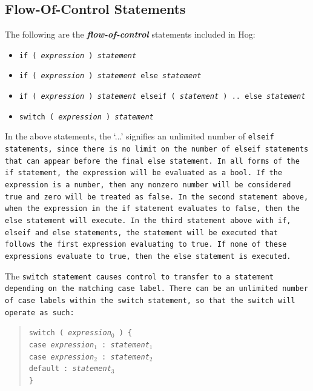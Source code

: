 \documentclass{article}
\begin{document}

\subsection{Flow-Of-Control Statements} %
\label{sub:flow_of_control_statements}

The following are the \textbf{\emph{flow-of-control}} statements included in Hog:

\begin{itemize}
  \item[] \tt if ( \rm \emph{expression} \tt ) \rm \emph{statement}
  \item[] \tt if ( \rm \emph{expression} \tt ) \rm \emph{statement} \tt else \rm \emph{statement}
  \item[] \tt if ( \rm \emph{expression} \tt ) \rm \emph{statement} \tt elseif ( \rm \emph{statement} \tt ) .. else 
  \rm \emph{statement}
  \item[] \tt switch ( \rm \emph{expression} \tt ) \rm \emph{statement} \rm
\end{itemize}

In the above statements, the ‘...’ signifies an unlimited number of \tt elseif \rm
statements, since there is no limit on the number of \tt elseif \rm statements
that can appear before the final \tt else \rm statement. In all forms of the \tt
if \rm statement, the expression will be evaluated as a \tt bool\rm. If the
expression is a number, then any non­zero number will be considered \tt true \rm
and zero will be treated as \tt false\rm. In the second statement above, when the
expression in the \tt if \rm statement evaluates to \tt false\rm, then the \tt
else \rm statement will execute. In the third statement above with \tt if\rm, \tt
elseif \rm and \tt else \rm statements, the statement will be executed that
follows the first expression evaluating to \tt true\rm. If none of these
expressions evaluate to \tt true\rm, then the \tt else \rm statement is executed.

The \tt switch \rm statement causes control to transfer to a statement depending
on the matching \tt case \rm label. There can be an unlimited number of \tt case
\rm labels within the \tt switch \rm statement, so that the \tt switch \rm will
operate as such:

\begin{quotation}
  \tt switch ( \rm \emph{expression}$_0$ \tt ) \{\\
  \indent \indent \tt case \rm \emph{expression}$_1$ \tt : \rm\emph{statement}$_1$ \\
  \indent \indent \tt case \rm \emph{expression}$_2$ \tt : \rm\emph{statement}$_2$ \\
  \indent \indent \tt default : \rm \emph{statement}$_3$ \\
  \indent \tt \}
\end{quotation}
\end{document}
